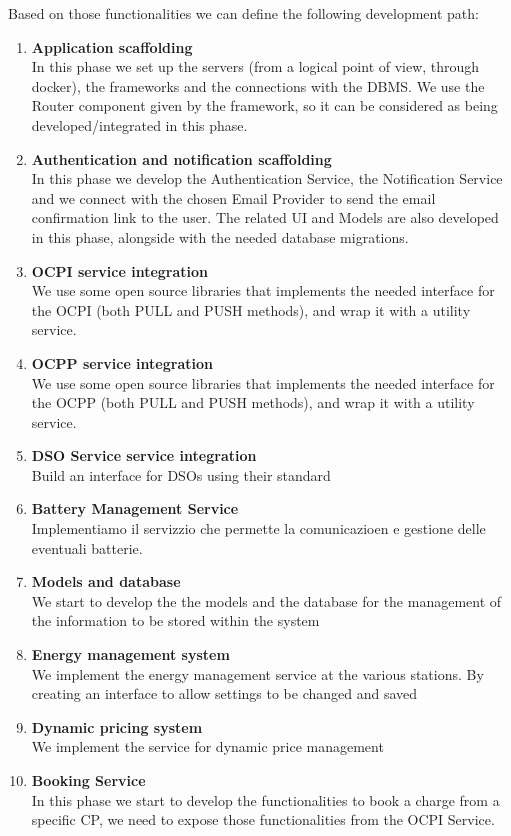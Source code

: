 Based on those functionalities we can define the following development path:
\begin{enumerate}
	\item \textbf{Application scaffolding}\\
	In this phase we set up the servers (from a logical point of view, through docker), the frameworks and the connections with the DBMS. We use the Router component given by the framework, so it can be considered as being developed/integrated in this phase.
	\item \textbf{Authentication and notification scaffolding}\\ In this phase we develop the Authentication Service, the Notification Service and we connect with the chosen Email Provider to send the email confirmation link to the user. The related UI and Models are also developed in this phase, alongside with the needed database migrations.
	\item \textbf{OCPI service integration}\\ We use some open source libraries that implements the needed interface for the OCPI (both PULL and PUSH methods), and wrap it with a utility service.
	\item \textbf{OCPP service integration}\\ We use some open source libraries that implements the needed interface for the OCPP (both PULL and PUSH methods), and wrap it with a utility service.
	\item \textbf{DSO Service service integration}\\  Build an interface for DSOs using their standard
	\item \textbf{Battery Management Service}\\ Implementiamo il servizzio che permette la comunicazioen e gestione delle eventuali batterie.
	\item \textbf{Models and database}\\ We start to develop the the models and the database for the management of the information to be stored within the system
	\item \textbf{Energy management system}\\ We implement the energy management service at the various stations. By creating an interface to allow settings to be changed and saved
	\item \textbf{Dynamic pricing system}\\ We implement the service for dynamic price management
	\item \textbf{Booking Service}\\ In this phase we start to develop the functionalities to book a charge from a specific CP, we need to expose those functionalities from the OCPI Service.

\end{enumerate}
